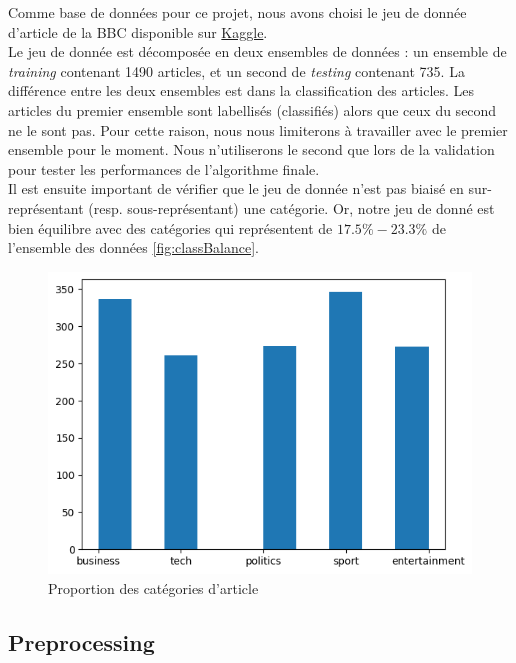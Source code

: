 \documentclass[a4paper,12pt]{article}
\begin{document}
Comme base de données pour ce projet, nous avons choisi le jeu de donnée d'article de la BBC disponible sur \href{ https://www.kaggle.com/c/learn-ai-bbc}{Kaggle}.\\

Le jeu de donnée est décomposée en deux ensembles de données : un ensemble de \textit{training} contenant 1490 articles, et un second de \textit{testing} contenant 735. La différence entre les deux ensembles est dans la classification des articles. Les articles du premier ensemble sont labellisés (classifiés) alors que ceux du second ne le sont pas. Pour cette raison, nous nous limiterons à travailler avec le premier ensemble pour le moment. Nous n'utiliserons le second que lors de la validation pour tester les performances de l'algorithme finale.\\

Il est ensuite important de vérifier que le jeu de donnée n'est pas biaisé en sur-représentant (resp. sous-représentant) une catégorie. Or, notre jeu de donné est bien équilibre avec des catégories qui représentent de $17.5 \%-23.3\%$ de l'ensemble des données \autoref{fig:classBalance}.\\

\begin{figure}[h]
  \centering
  \includegraphics{./images/class_balanced.png} %
  \caption{Proportion des catégories d'article}
  \label{fig:classBalance}
\end{figure}

\subsection{Preprocessing}
\end{document}

